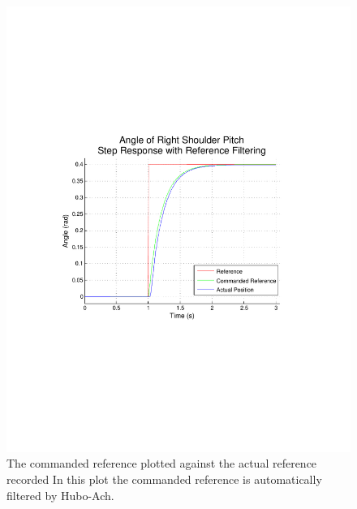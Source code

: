 \begin{figure}[thpb]
  \centering
\includegraphics[width=0.8\columnwidth]{./examples/pix/RSP-Zp4-step-filter-real-crop.pdf}
  \caption{The commanded reference plotted against the actual reference recorded  In this plot the commanded reference is automatically filtered by Hubo-Ach.}
  \label{fig:singleJointStepFiltered}
\end{figure}

